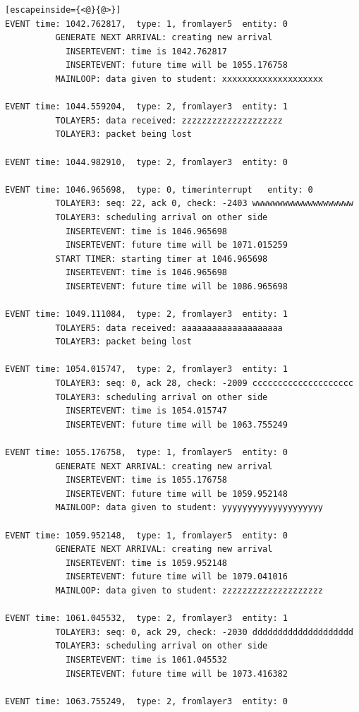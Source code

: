 \documentclass[paper=a4, fontsize=11pt]{scrartcl}
\numberwithin{equation}{section}		%
\numberwithin{figure}{section}			%
\numberwithin{table}{section}				%
\begin{document}
\begin{lstlisting}[escapeinside={<@}{@>}]
EVENT time: 1042.762817,  type: 1, fromlayer5  entity: 0
          GENERATE NEXT ARRIVAL: creating new arrival
            INSERTEVENT: time is 1042.762817
            INSERTEVENT: future time will be 1055.176758
          MAINLOOP: data given to student: xxxxxxxxxxxxxxxxxxxx

EVENT time: 1044.559204,  type: 2, fromlayer3  entity: 1
          TOLAYER5: data received: zzzzzzzzzzzzzzzzzzzz
          TOLAYER3: packet being lost

EVENT time: 1044.982910,  type: 2, fromlayer3  entity: 0

EVENT time: 1046.965698,  type: 0, timerinterrupt   entity: 0
          TOLAYER3: seq: 22, ack 0, check: -2403 wwwwwwwwwwwwwwwwwwww
          TOLAYER3: scheduling arrival on other side
            INSERTEVENT: time is 1046.965698
            INSERTEVENT: future time will be 1071.015259
          START TIMER: starting timer at 1046.965698
            INSERTEVENT: time is 1046.965698
            INSERTEVENT: future time will be 1086.965698

EVENT time: 1049.111084,  type: 2, fromlayer3  entity: 1
          TOLAYER5: data received: aaaaaaaaaaaaaaaaaaaa
          TOLAYER3: packet being lost

EVENT time: 1054.015747,  type: 2, fromlayer3  entity: 1
          TOLAYER3: seq: 0, ack 28, check: -2009 cccccccccccccccccccc
          TOLAYER3: scheduling arrival on other side
            INSERTEVENT: time is 1054.015747
            INSERTEVENT: future time will be 1063.755249

EVENT time: 1055.176758,  type: 1, fromlayer5  entity: 0
          GENERATE NEXT ARRIVAL: creating new arrival
            INSERTEVENT: time is 1055.176758
            INSERTEVENT: future time will be 1059.952148
          MAINLOOP: data given to student: yyyyyyyyyyyyyyyyyyyy

EVENT time: 1059.952148,  type: 1, fromlayer5  entity: 0
          GENERATE NEXT ARRIVAL: creating new arrival
            INSERTEVENT: time is 1059.952148
            INSERTEVENT: future time will be 1079.041016
          MAINLOOP: data given to student: zzzzzzzzzzzzzzzzzzzz

EVENT time: 1061.045532,  type: 2, fromlayer3  entity: 1
          TOLAYER3: seq: 0, ack 29, check: -2030 dddddddddddddddddddd
          TOLAYER3: scheduling arrival on other side
            INSERTEVENT: time is 1061.045532
            INSERTEVENT: future time will be 1073.416382

EVENT time: 1063.755249,  type: 2, fromlayer3  entity: 0


\end{lstlisting}
\end{document}
